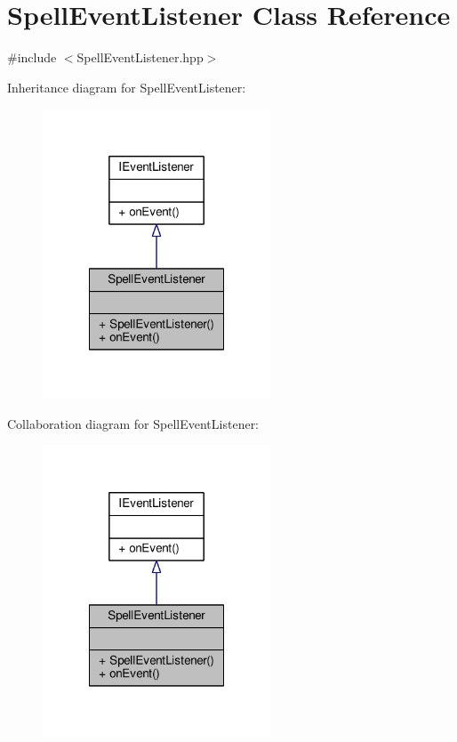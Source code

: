 \hypertarget{class_spell_event_listener}{\section{Spell\-Event\-Listener Class Reference}
\label{class_spell_event_listener}
}


{\ttfamily \#include $<$Spell\-Event\-Listener.\-hpp$>$}



Inheritance diagram for Spell\-Event\-Listener\-:
\nopagebreak
\begin{figure}[H]
\begin{center}
\leavevmode
\includegraphics[width=192pt]{class_spell_event_listener__inherit__graph}
\end{center}
\end{figure}


Collaboration diagram for Spell\-Event\-Listener\-:
\nopagebreak
\begin{figure}[H]
\begin{center}
\leavevmode
\includegraphics[width=192pt]{class_spell_event_listener__coll__graph}
\end{center}
\end{figure}
